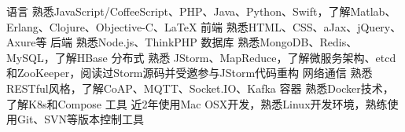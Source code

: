 


\begin{cvskills}


\cvskill
{语言} %
{熟悉JavaScript/CoffeeScript、PHP、Java、Python、Swift，了解Matlab、Erlang、Clojure、Objective-C、LaTeX} %
\cvskill
{前端 } %
{ 熟悉HTML、CSS、aJax、jQuery、Axure等} %
\cvskill
{后端} %
{ 熟悉Node.js、ThinkPHP} %
\cvskill
{数据库} %
{熟悉MongoDB、Redis、MySQL，了解HBase} %
\cvskill
{分布式} %
{ 熟悉 JStorm、MapReduce，了解微服务架构、etcd和ZooKeeper，阅读过Storm源码并受邀参与JStorm代码重构} %
\cvskill
{网络通信} %
{  熟悉RESTful风格，了解CoAP、MQTT、Socket.IO、Kafka} %
\cvskill
{容器 } %
{  熟悉Docker技术，了解K8s和Compose} %
\cvskill
{工具 } %
{  近2年使用Mac OSX开发，熟悉Linux开发环境，熟练使用Git、SVN等版本控制工具} %

\end{cvskills}